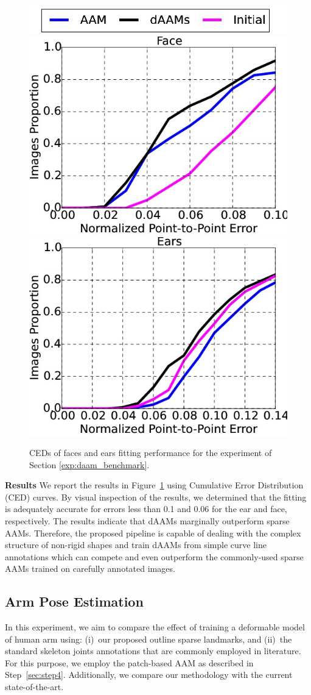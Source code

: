 \begin{figure}[b!]
    \centering
    \includegraphics[width=0.6\columnwidth]{resources/Annotation_Correction/DAAMBenchmark/legend}
    \\
    \includegraphics[width=0.48\columnwidth]{resources/Annotation_Correction/DAAMBenchmark/face}
    \includegraphics[width=0.48\columnwidth]{resources/Annotation_Correction/DAAMBenchmark/ear}
    \caption{CEDs of faces and ears fitting performance for the experiment of Section \ref{exp:daam_benchmark}.}
    \label{fig:daam_benchmark}
\end{figure}

\noindent\textbf{Results} We report the results in Figure~\ref{fig:daam_benchmark} using Cumulative Error Distribution (CED) curves. By visual inspection of the results, we determined that the fitting is adequately accurate for errors less than 0.1 and 0.06 for the ear and face, respectively. The results indicate that dAAMs marginally outperform sparse AAMs. Therefore, the proposed pipeline is capable of dealing with the complex structure of non-rigid shapes and train dAAMs from simple curve line annotations which can compete and even outperform the commonly-used sparse AAMs trained on carefully annotated images.


\subsection{Arm Pose Estimation}
\label{exp:benchmark}
In this experiment, we aim to compare the effect of training a deformable model of human arm using: (i)~our proposed outline sparse landmarks, and (ii)~the standard skeleton joints annotations that are commonly employed in literature. For this purpose, we employ the patch-based AAM as described in Step~\ref{sec:step4}. Additionally, we compare our methodology with the current state-of-the-art.


